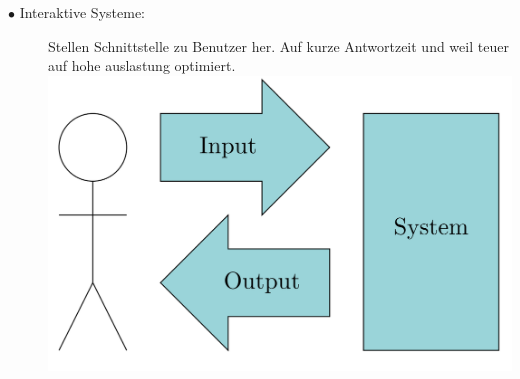 \documentclass[a4paper, 8pt]{extarticle}
\begin{document}
\begin{multicols*}{3}
\begin{description}
						\item[$\bullet$ Interaktive Systeme:]
							Stellen Schnittstelle zu Benutzer her. Auf kurze Antwortzeit und weil teuer auf hohe auslastung optimiert.
							\includegraphics[width=0.6\linewidth,left]{img/Interaktive_Systeme.PNG} 
					\end{description}
		

\end{multicols*}
\end{document}

